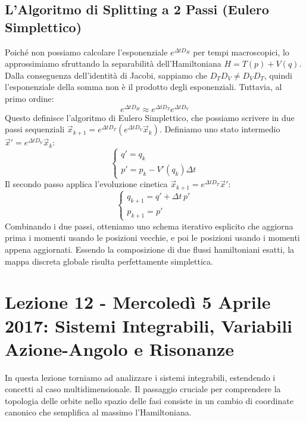 \documentclass[12pt,a4paper]{article}
\begin{document}
\subsection{L'Algoritmo di Splitting a 2 Passi (Eulero Simplettico)}
Poiché non possiamo calcolare l'esponenziale $e^{\Delta t D_H}$ per tempi macroscopici, lo approssimiamo sfruttando la separabilità dell'Hamiltoniana $H = T(p) + V(q)$. Dalla conseguenza dell'identità di Jacobi, sappiamo che $D_T D_V \neq D_V D_T$, quindi l'esponenziale della somma non è il prodotto degli esponenziali. Tuttavia, al primo ordine:
\begin{equation}
e^{\Delta t D_H} \approx e^{\Delta t D_T} e^{\Delta t D_V}
\end{equation}
Questo definisce l'algoritmo di Eulero Simplettico, che possiamo scrivere in due passi sequenziali $\vec{x}_{k+1} = e^{\Delta t D_T} \left( e^{\Delta t D_V} \vec{x}_k \right)$.
Definiamo uno stato intermedio $\vec{x}' = e^{\Delta t D_V} \vec{x}_k$:
\begin{equation}
\begin{cases}
q' = q_k \\
p' = p_k - V'(q_k)\Delta t
\end{cases}
\end{equation}
Il secondo passo applica l'evoluzione cinetica $\vec{x}_{k+1} = e^{\Delta t D_T} \vec{x}'$:
\begin{equation}
\begin{cases}
q_{k+1} = q' + \Delta t \, p' \\
p_{k+1} = p'
\end{cases}
\end{equation}
Combinando i due passi, otteniamo uno schema iterativo esplicito che aggiorna prima i momenti usando le posizioni vecchie, e poi le posizioni usando i momenti appena aggiornati. Essendo la composizione di due flussi hamiltoniani esatti, la mappa discreta globale risulta perfettamente simplettica.

\newpage
\section{Lezione 12 - Mercoledì 5 Aprile 2017: Sistemi Integrabili, Variabili Azione-Angolo e Risonanze}

In questa lezione torniamo ad analizzare i sistemi integrabili, estendendo i concetti al caso multidimensionale. Il passaggio cruciale per comprendere la topologia delle orbite nello spazio delle fasi consiste in un cambio di coordinate canonico che semplifica al massimo l'Hamiltoniana.
\end{document}
